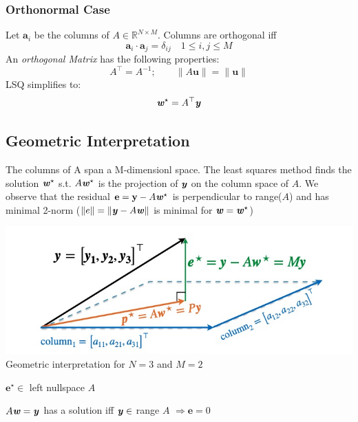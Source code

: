     \subsubsection{Orthonormal Case}
        Let $\mathbf{a}_i$ be the columns of $A \in\mathbb{R}^{N\times M}$. Columns are orthogonal iff \begin{equation*}
            \mathbf{a}_i \cdot \mathbf{a}_j = \delta_{ij} \quad 1 \leq i,j \leq M
        \end{equation*}
        An \textit{orthogonal Matrix} has the following properties:
        \begin{equation*}
            A^\top = A^{-1}; \qquad \|A\mathbf{u}\| = \|\mathbf{u}\|
        \end{equation*}
        LSQ simplifies to:
        \begin{equation*}
            \textbf{\textit{w}}^\star = A^\top\textbf{\textit{y}}
        \end{equation*}
        
    \subsection{Geometric Interpretation}
        The columns of A span a M-dimensionl space. The least squares method finds the solution $\textbf{\textit{w}}^\star$ s.t. $A\textbf{\textit{w}}^\star$ is the projection of $\textbf{\textit{y}}$ on the column space of $A$.
        We observe that the residual $\mathbf{e} = \mathbf{y}-A\textbf{\textit{w}}^\star$ is perpendicular to  range($A$) and has minimal 2-norm ($\|e\|=\|\textbf{\textit{y}}-A\textbf{\textit{w}}\|$ is minimal for $\textbf{\textit{w}} = \textbf{\textit{w}}^\star$)
        \begin{center}
            \includegraphics[width = 0.7\linewidth]{images/01/geometric_interpretation.jpg}\\
            Geometric interpretation for $N=3$ and $M = 2$
        \end{center}
        
        $\mathbf{e}^\star\in$ left nullspace $A$
        
        $A\textbf{\textit{w}} = \textbf{\textit{y}}$ has a solution iff $\textbf{\textit{y}}\in$ range $A$ $\Rightarrow \mathbf{e} = 0$
